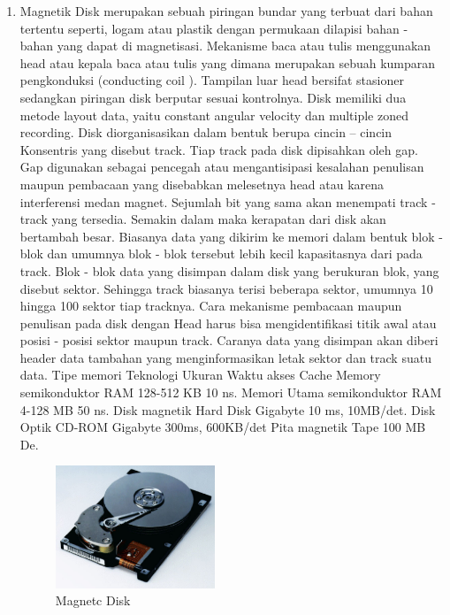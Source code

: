 \begin{enumerate}
\item Magnetik Disk merupakan sebuah piringan bundar yang terbuat dari bahan tertentu seperti, logam atau plastik dengan permukaan dilapisi bahan - bahan yang dapat di magnetisasi. Mekanisme baca atau tulis menggunakan head atau kepala baca atau tulis yang dimana merupakan sebuah kumparan pengkonduksi (conducting coil ). Tampilan luar head bersifat stasioner sedangkan piringan disk berputar sesuai kontrolnya. Disk memiliki dua metode layout data, yaitu  constant angular velocity dan multiple zoned recording. Disk diorganisasikan dalam bentuk berupa cincin – cincin
Konsentris yang disebut track. Tiap track pada disk dipisahkan oleh gap. Gap digunakan sebagai pencegah atau mengantisipasi kesalahan penulisan maupun pembacaan yang disebabkan melesetnya head atau karena interferensi medan magnet. Sejumlah bit yang sama akan menempati track - track yang tersedia. Semakin dalam maka kerapatan dari disk akan bertambah besar. Biasanya data yang dikirim ke memori dalam bentuk blok - blok dan umumnya blok - blok tersebut lebih kecil kapasitasnya dari pada track. Blok - blok data yang disimpan dalam disk yang berukuran blok, yang disebut sektor. Sehingga track biasanya terisi beberapa sektor, umumnya 10 hingga 100 sektor tiap tracknya. Cara mekanisme pembacaan maupun penulisan pada disk dengan Head harus bisa mengidentifikasi titik awal atau posisi - posisi sektor maupun track. Caranya data yang disimpan akan diberi header data tambahan yang menginformasikan letak sektor dan track suatu data. Tipe memori Teknologi Ukuran Waktu akses Cache Memory semikonduktor RAM 128-512 KB 10 ns. Memori Utama semikonduktor RAM 4-128 MB 50 ns. Disk magnetik Hard Disk Gigabyte 10 ms, 10MB/det. Disk Optik CD-ROM Gigabyte 300ms, 600KB/det Pita magnetik Tape 100 MB De.

\begin{figure}[htbp]
\centering
\includegraphics[width=0.45\textwidth]{figures/image/magnetic_disk.jpg}
\caption{Magnetc Disk}
\label{labelgambar4l}
\end{figure}

\end{enumerate}


